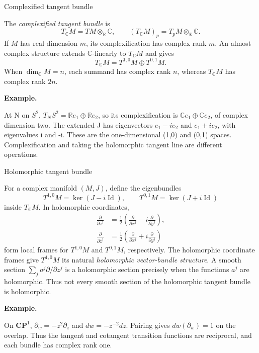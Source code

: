 \documentclass[11pt]{article}
\makeatletter
\newcommand{\R}{\mathbb R}
\newcommand{\C}{\mathbb C}
\newcommand{\id}{\operatorname{Id}}
\newcounter{definition}
\newcommand{\CP}{\mathbf{CP}}
\newcommand{\exampleheading}{\par\medskip\textbf{Example.}\par\smallskip}
\newcommand{\currentdefinition}[1]{\protected@edef\@currentlabel{#1}}
\makeatother
\begin{document}
\begin{definitionbox}{Complexified tangent bundle}
\currentdefinition{\thedefinition}
\label{source:S14}

The \emph{complexified tangent bundle} is
\[
T_{\C}M=TM\otimes_{\R}\C,
\qquad (T_{\C}M)_p=T_pM\otimes_{\R}\C.
\]
If $M$ has real dimension $m$, its complexification has complex rank $m$.
An almost complex structure extends $\C$-linearly to $T_{\C}M$ and gives
\[
T_{\C}M=T^{1,0}M\oplus T^{0,1}M.
\]
When $\dim_{\C}M=n$, each summand has complex rank $n$, whereas
$T_{\C}M$ has complex rank $2n$.


\exampleheading
At N on $S^2$, $T_NS^2=\R e_1\oplus\R e_2$, so its complexification is $\C e_1\oplus\C e_2$, of complex dimension two. The extended J has eigenvectors $e_1-i e_2$ and $e_1+i e_2$, with eigenvalues i and -i. These are the one-dimensional (1,0) and (0,1) spaces. Complexification and taking the holomorphic tangent line are different operations.
\end{definitionbox}

\newpage
\begin{definitionbox}{Holomorphic tangent bundle}
\currentdefinition{\thedefinition}
\label{source:S15}

For a complex manifold $(M,J)$, define the eigenbundles
\[
T^{1,0}M=\ker(J-i\id),\qquad T^{0,1}M=\ker(J+i\id)
\]
inside $T_{\C}M$. In holomorphic coordinates,
\begin{align*}
\frac{\partial}{\partial z^j}
&=\frac12\left(\frac{\partial}{\partial x^j}
-i\frac{\partial}{\partial y^j}\right),\\
\frac{\partial}{\partial\bar z^j}
&=\frac12\left(\frac{\partial}{\partial x^j}
+i\frac{\partial}{\partial y^j}\right)
\end{align*}
form local frames for $T^{1,0}M$ and $T^{0,1}M$, respectively.
The holomorphic coordinate frames give $T^{1,0}M$ its natural
\emph{holomorphic vector-bundle structure}. A smooth section
$\sum_j a^j\partial/\partial z^j$ is a holomorphic section precisely when
the functions $a^j$ are holomorphic. Thus not every smooth section of the
holomorphic tangent bundle is holomorphic.


\exampleheading
On $\CP^1$, $\partial_w=-z^2\partial_z$ and $dw=-z^{-2}dz$. Pairing gives $dw(\partial_w)=1$ on the overlap. Thus the tangent and cotangent transition functions are reciprocal, and each bundle has complex rank one.
\end{definitionbox}
\end{document}
